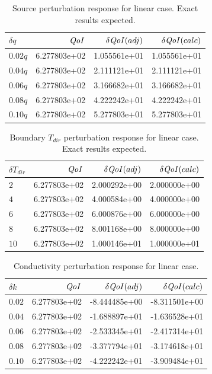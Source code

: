 \documentclass{article}
\newcommand{\qoi}{{\it QoI}\xspace}
\newcommand{\Tdir}{T_{dir}}
\begin{document}
\begin{table}[H]
\centering
  \begin{tabular}{| l | r | r | r |}
    \hline
    $\delta q$ & $\qoi$ & $\delta \qoi (adj)$ & $\delta \qoi (calc)$ \\ \hline
    $0.02q$ & 6.277803e+02 &  1.055561e+01 & 1.055561e+01  \\ \hline
    $0.04q$ & 6.277803e+02 &  2.111121e+01 & 2.111121e+01 \\ \hline
    $0.06q$ & 6.277803e+02 &  3.166682e+01 & 3.166682e+01  \\ \hline
    $0.08q$ & 6.277803e+02 &  4.222242e+01 & 4.222242e+01  \\ \hline
    $0.10q$ & 6.277803e+02 &  5.277803e+01 & 5.277803e+01  \\ \hline
    \end{tabular}
  \caption{Source perturbation response for linear case. Exact results expected.}
\end{table}

\begin{table}[H]
\centering
  \begin{tabular}{| l | r | r | r |}
    \hline
    $\delta \Tdir$ & $\qoi$ & $\delta \qoi (adj)$ & $\delta \qoi (calc)$ \\ \hline
    $2$ & 6.277803e+02 &  2.000292e+00  &  2.000000e+00   \\ \hline
    $4$ & 6.277803e+02 &  4.000584e+00 &  4.000000e+00  \\ \hline
    $6$ & 6.277803e+02 &  6.000876e+00 &  6.000000e+00   \\ \hline
    $8$ & 6.277803e+02 & 8.001168e+00 & 8.000000e+00   \\ \hline
    $10$ & 6.277803e+02 & 1.000146e+01 & 1.000000e+01   \\ \hline
    \end{tabular}
  \caption{Boundary $\Tdir$ perturbation response for linear case. Exact results expected.}
\end{table}

\begin{table}[H]
\centering
  \begin{tabular}{| l | r | r | r |}
    \hline
    $\delta k$ & $\qoi$ & $\delta \qoi (adj)$ & $\delta \qoi (calc)$ \\ \hline
    $0.02$ & 6.277803e+02 & -8.444485e+00 &   -8.311501e+00  \\ \hline
    $0.04$ & 6.277803e+02 & -1.688897e+01 &  -1.636528e+01  \\ \hline
    $0.06$ & 6.277803e+02 & -2.533345e+01 &   -2.417314e+01  \\ \hline
    $0.08$ & 6.277803e+02 & -3.377794e+01 & -3.174618e+01 \\ \hline
    $0.10$ & 6.277803e+02 & -4.222242e+01 &  -3.909484e+01  \\ \hline
    \end{tabular}
  \caption{Conductivity perturbation response for linear case.}
\end{table}
\end{document}
